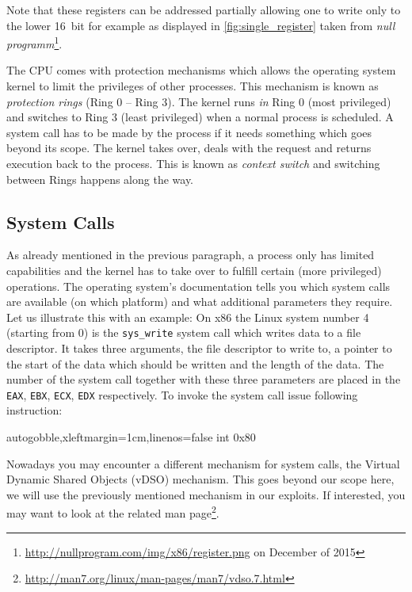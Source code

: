 \documentclass[article]{uibk}
\begin{document}
Note that these registers can be addressed partially allowing one to write only
to the lower \SI{16}{bit} for example as displayed in
\cref{fig:single_register} taken from \textit{null
programm}\footnote{\url{http://nullprogram.com/img/x86/register.png} on
December of 2015}.

The CPU comes with protection mechanisms which allows the operating system
kernel to limit the privileges of other processes. This mechanism is known as
\textit{protection rings} (Ring 0 -- Ring 3). The kernel runs \emph{in} Ring 0
(most privileged) and switches to Ring 3 (least privileged) when a normal
process is scheduled. A system call has to be made by the process if it needs
something which goes beyond its scope. The kernel takes over, deals with the
request and returns execution back to the process. This is known as
\textit{context switch} and switching between Rings happens along the way.

\subsection{System Calls}

As already mentioned in the previous paragraph, a process only has limited
capabilities and the kernel has to take over to fulfill certain (more
privileged) operations. The operating system's documentation tells you which
system calls are available (on which platform) and what additional parameters
they require. Let us illustrate this with an example: On x86 the Linux system
number 4 (starting from 0) is the \texttt{sys\_write} system call which writes
data to a file descriptor. It takes three arguments, the file descriptor to
write to, a pointer to the start of the data which should be written and the
length of the data. The number of the system call together with these three
parameters are placed in the \texttt{EAX}, \texttt{EBX}, \texttt{ECX},
\texttt{EDX} respectively. To invoke the system call issue following
instruction:

\begin{nasmcode*}{autogobble,xleftmargin=1cm,linenos=false}
    int     0x80
\end{nasmcode*}

Nowadays you may encounter a different mechanism for system calls, the Virtual
Dynamic Shared Objects (vDSO) mechanism. This goes beyond our scope here, we
will use the previously mentioned mechanism in our exploits. If interested, you
may want to look at the related man
page\footnote{\url{http://man7.org/linux/man-pages/man7/vdso.7.html}}.
\end{document}

